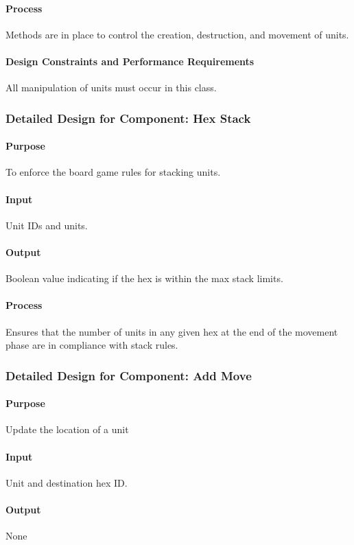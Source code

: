 \documentclass[12pt,a4paper,titlepage]{article}
\begin{document}
\paragraph{Process} Methods are in place to control the creation, destruction, and movement of units.
\paragraph{Design Constraints and Performance Requirements} All manipulation of units must occur in this class.

\subsubsection{Detailed Design for Component: Hex Stack}
\paragraph{Purpose} To enforce the board game rules for stacking units.
\paragraph{Input} Unit IDs and units. 
\paragraph{Output} Boolean value indicating if the hex is within the max stack limits.
\paragraph{Process} Ensures that the number of units in any given hex at the end of the movement phase are in compliance with stack rules.

\subsubsection{Detailed Design for Component: Add Move}
\paragraph{Purpose} Update the location of a unit
\paragraph{Input} Unit and destination hex ID.
\paragraph{Output} None
\end{document}
